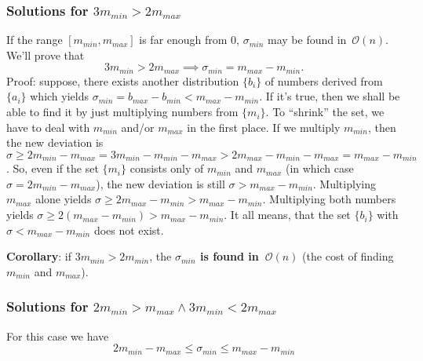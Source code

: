 \documentclass[paper=a4,parskip=half,DIV=12]{leetcode}
\begin{document}
\subsubsection{Solutions for $3 m_{min} > 2 m_{max}$}
\label{sec:ZCP3Z}

If the range $[m_{min}, m_{max}]$ is far enough from $0$, $\sigma_{min}$ may be
found in~$\mathcal{O}(n)$. We'll prove that
\begin{equation}
  3 m_{min} > 2 m_{max} \implies \sigma_{min} = m_{max} - m_{min}.
  \label{eq:FX72R}
\end{equation}
Proof: suppose, there exists another distribution $\{b_i\}$ of numbers derived
from $\{a_i\}$ which yields $\sigma_{min} = b_{max} - b_{min} < m_{max} -
m_{min}$. If it's true, then we shall be able to find it by just multiplying
numbers from $\{m_i\}$. To ``shrink'' the set, we have to deal with $m_{min}$
and/or $m_{max}$ in the first place. If we multiply $m_{min}$, then the new
deviation is $\sigma \ge 2 m_{min} - m_{max} = 3 m_{min} - m_{min} - m_{max} > 2
m_{max} - m_{min} - m_{max} = m_{max} - m_{min}$. So, even if the set $\{m_i\}$
consists only of $m_{min}$ and $m_{max}$ (in which case $\sigma = 2 m_{min} -
m_{max}$), the new deviation is still $\sigma > m_{max} - m_{min}$. Multiplying
$m_{max}$ alone yields $\sigma \ge 2 m_{max} - m_{min} > m_{max} - m_{min}$.
Multiplying both numbers yields $\sigma \ge 2 (m_{max} - m_{min}) > m_{max} -
m_{min}$. It all means, that the set $\{b_i\}$ with $\sigma < m_{max} - m_{min}$
does not exist.

\textbf{Corollary}: if $3 m_{min} > 2 m_{min}$, the \textbf{$\sigma_{min}$ is
found in~$\mathcal{O}(n)$} (the cost of finding $m_{min}$ and $m_{max}$).

\subsubsection{Solutions for $2 m_{min} > m_{max} \wedge 3 m_{min} < 2 m_{max}$}
\label{sec:6GNBB}

For this case we have
\begin{equation}
  2 m_{min} - m_{max} \le \sigma_{min} \le m_{max} - m_{min}
  \label{eq:9W8Z2}
\end{equation}
\end{document}
